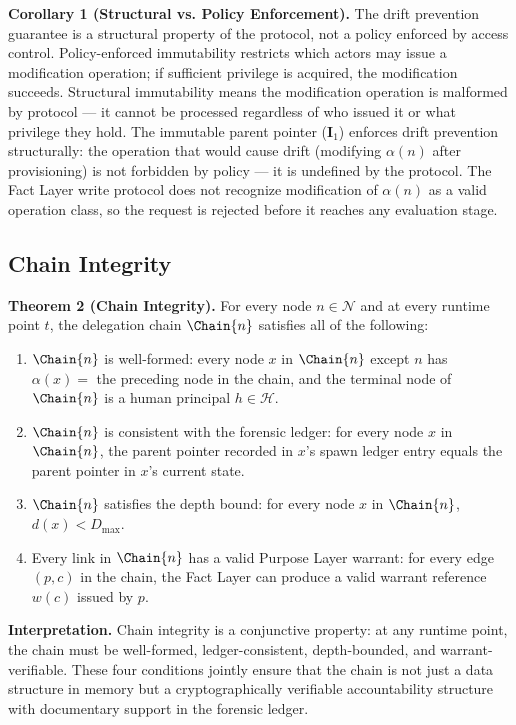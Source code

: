 \bigskip
\noindent\textbf{Corollary 1 (Structural vs. Policy Enforcement).} The drift prevention guarantee is a structural property of the protocol, not a policy enforced by access control. Policy-enforced immutability restricts which actors may issue a modification operation; if sufficient privilege is acquired, the modification succeeds. Structural immutability means the modification operation is malformed by protocol — it cannot be processed regardless of who issued it or what privilege they hold. The immutable parent pointer ($\textbf{I}_1$) enforces drift prevention structurally: the operation that would cause drift (modifying $\alpha(n)$ after provisioning) is not forbidden by policy — it is undefined by the protocol. The Fact Layer write protocol does not recognize modification of $\alpha(n)$ as a valid operation class, so the request is rejected before it reaches any evaluation stage.

\subsection{Chain Integrity}
\label{sec:chain-integrity}

\textbf{Theorem 2 (Chain Integrity).} For every node $n \in \mathcal{N}$ and at every runtime point $t$, the delegation chain $\Chain{n}$ satisfies all of the following:

\begin{enumerate}
\item[(CI1)] $\Chain{n}$ is well-formed: every node $x$ in $\Chain{n}$ except $n$ has $\alpha(x) = $ the preceding node in the chain, and the terminal node of $\Chain{n}$ is a human principal $h \in \mathcal{H}$.
\item[(CI2)] $\Chain{n}$ is consistent with the forensic ledger: for every node $x$ in $\Chain{n}$, the parent pointer recorded in $x$'s spawn ledger entry equals the parent pointer in $x$'s current state.
\item[(CI3)] $\Chain{n}$ satisfies the depth bound: for every node $x$ in $\Chain{n}$, $d(x) < D_{\max}$.
\item[(CI4)] Every link in $\Chain{n}$ has a valid Purpose Layer warrant: for every edge $(p, c)$ in the chain, the Fact Layer can produce a valid warrant reference $w(c)$ issued by $p$.
\end{enumerate}

\bigskip
\noindent\textbf{Interpretation.} Chain integrity is a conjunctive property: at any runtime point, the chain must be well-formed, ledger-consistent, depth-bounded, and warrant-verifiable. These four conditions jointly ensure that the chain is not just a data structure in memory but a cryptographically verifiable accountability structure with documentary support in the forensic ledger.

